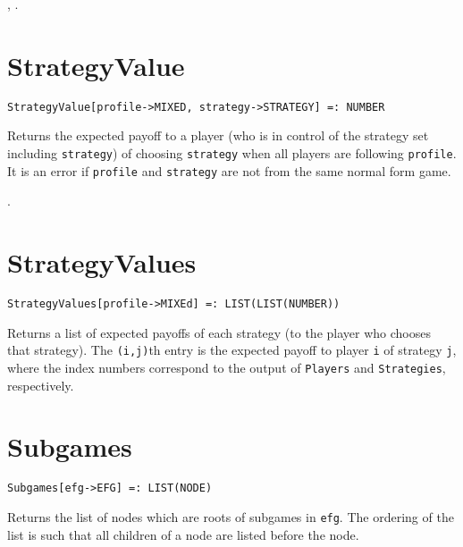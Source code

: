 \seealso {},
.


\section*{StrategyValue}\label{PrimStrategyValue}
\begin{verbatim}
StrategyValue[profile->MIXED, strategy->STRATEGY] =: NUMBER 
\end{verbatim}

\noindent
Returns the expected payoff to a player (who is in control of the
strategy set including \verb+strategy+) of choosing \verb+strategy+ when
all players are following \verb+profile+.  It is an error if
\verb+profile+ and \verb+strategy+ are not from the same normal form
game.

\seealso {}.


\section*{StrategyValues}\label{PrimStrategyValues}
\begin{verbatim}
StrategyValues[profile->MIXEd] =: LIST(LIST(NUMBER)) 
\end{verbatim}

Returns a list of expected payoffs of each strategy (to the player
who chooses that strategy).  The \verb+(i,j)+th entry is
the expected payoff to player \verb+i+ of
strategy \verb+j+, where the index numbers correspond to the output of
\verb+Players+ and \verb+Strategies+, respectively.


\section*{Subgames}\label{PrimSubgames}
\begin{verbatim}
Subgames[efg->EFG] =: LIST(NODE) 
\end{verbatim}

\noindent
Returns the list of nodes which are roots of subgames in \verb+efg+.
The ordering of the list is such that
all children of a node are listed before the node.

